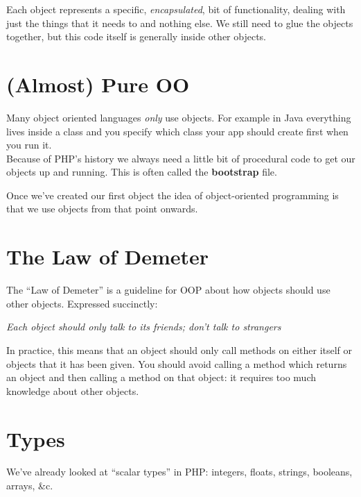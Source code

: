 Each object represents a specific, \textit{encapsulated}, bit of functionality, dealing with just the things that it needs to and nothing else. We still need to glue the objects together, but this code itself is generally inside other objects.



\section{(Almost) Pure OO}

Many object oriented languages \textit{only} use objects. For example in Java everything lives inside a class and you specify which class your app should create first when you run it.
\\

Because of PHP's history we always need a little bit of procedural code to get our objects up and running. This is often called the \textbf{bootstrap} file.


Once we've created our first object the idea of object-oriented programming is that we use objects from that point onwards.


\section{The Law of Demeter}

The ``Law of Demeter'' is a guideline for OOP about how objects should use other objects. Expressed succinctly:

\begin{center}
    \textit{Each object should only talk to its friends; don't talk to strangers}
\end{center}

In practice, this means that an object should only call methods on either itself or objects that it has been given. You should avoid calling a method which returns an object and then calling a method on that object: it requires too much knowledge about other objects.



\section{Types}

We've already looked at ``scalar types'' in PHP: integers, floats, strings, booleans, arrays, \&c.
\\

